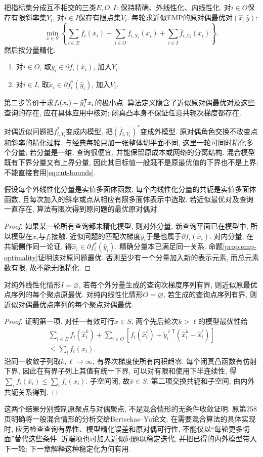 把指标集分成互不相交的三类$E,O,I$: 保持精确、外线性化、内线性化. 对$i\in O$保存有限斜率集$Y_i$, 对$i\in I$保存有限点集$V_i$. 每轮求近似EMP的原对偶最优对$(\widehat x,\widehat y)$:
\[
 \min_{x\in S}\left\{
 \sum_{i\in E}f_i(x_i)+\sum_{i\in O}f_{i,Y_i}(x_i)
 +\sum_{i\in I}\overline f_{i,V_i}(x_i)\right\}.
\]
然后按分量精化:
\begin{enumerate}
\item 对$i\in O$, 取$\widetilde y_i\in\partial f_i(\widehat x_i)$, 加入$Y_i$.
\item 对$i\in I$, 取$\widetilde x_i\in\partial f_i^*(\widehat y_i)$, 加入$V_i$.
\end{enumerate}
第二步等价于求$f_i(x_i)-\widehat y_i^{\mathsf T} x_i$的极小点. 算法定义隐含了近似原对偶最优对及这些查询的存在, 应在具体应用中核对; 闭真凸本身不保证任意共轭次梯度都存在.

对偶近似问题把$f_{i,Y_i}^*$变成内模型, 把$(\overline f_{i,V_i})^*$变成外模型. 原对偶角色交换不改变点和斜率的精化过程. 与经典每轮只加一张整体切平面不同, 这里一轮可同时精化多个分量; 若分量是一维, 查询很便宜, 并能保留原成本或网络的分离结构. 混合模型既有下界分量又有上界分量, 因此其目标值一般既不是原最优值的下界也不是上界; 不能直接套用\eqref{eq:cut-bounds}.

\begin{proposition}
假设每个外线性化分量是实值多面体函数, 每个内线性化分量的共轭是实值多面体函数, 且每次加入的斜率或点从相应有限多面体表示中选取. 若近似最优对及查询一直存在, 算法有限次得到原问题的最优原对偶对.
\end{proposition}
\begin{proof}
如果某一轮所有查询都未精化模型, 则对外分量, 新查询平面已在模型中, 所以模型在$\widehat x_i$与$f_i$接触. 近似问题的匹配次梯度$\widehat y_i$于是也属于$\partial f_i(\widehat x_i)$. 对内分量, 在共轭侧作同一论证, 得$\widehat x_i\in\partial f_i^*(\widehat y_i)$. 精确分量本已满足同一关系. 命题\ref{prop:emp-optimality}证明该对原问题最优. 否则至少有一个分量加入新的表示元素, 而总元素数有限, 故不能无限精化.
\end{proof}

\begin{proposition}\label{prop:emp-outer-limit}
对纯外线性化情形$I=\varnothing$, 若每个外分量生成的查询次梯度序列有界, 则近似原最优点序列的每个聚点原最优. 对纯内线性化情形$O=\varnothing$, 若生成的查询点序列有界, 则近似对偶最优点序列的每个聚点对偶最优.
\end{proposition}
\begin{proof}
证明第一项. 对任一有效可行$x\in S$, 两个先后轮次$k>\ell$的模型最优性给
\begin{multline*}
 \sum_{i\in E}f_i(\widehat x_i^k)+
 \sum_{i\in O}\left[f_i(\widehat x_i^\ell)
 +\widetilde y_i^{\ell\mathsf T}(\widehat x_i^k-\widehat x_i^\ell)\right]\\
 \le\sum_i f_i(x_i).
\end{multline*}
沿同一收敛子列取$k,\ell\to\infty$, 有界次梯度使所有内积趋零. 每个闭真凸函数有仿射下界, 因此在有界子列上其值有统一下界, 可以对有限和使用下半连续性, 得$\sum_i f_i(\bar x_i)\le\sum_i f_i(x_i)$. 子空间闭, 故$\bar x\in S$. 第二项交换共轭和子空间, 由内外共轭关系得到.
\end{proof}

这两个结果分别控制原聚点与对偶聚点, 不是混合情形的无条件收敛证明. 原第258页明确将一般混合情形的分析交给Bertsekas--Yu论文. 在需要混合算法的具体实现时, 应另检查查询有界性、模型精化误差和原对偶可行性, 不能仅以“每轮更多切面”替代这些条件. 近端项也可加入近似问题以稳定迭代, 并把已得的内外模型带入下一轮; 下一章解释这种稳定化为何有用.
